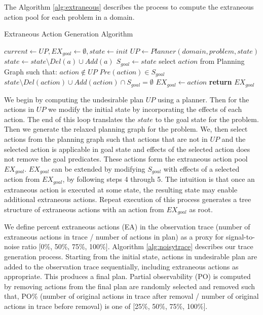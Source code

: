 The Algorithm \ref{alg:extraneous} describes the process to compute the extraneous action pool for each problem in a domain.
\begin{algorithm}
    \caption{Extraneous Action Generation Algorithm}
    \label{alg:extraneous}
    \begin{algorithmic}[1]
        	\State $current\gets UP, EX_{goal}\gets \emptyset, state \gets init$
        	\State $UP\gets Planner(domain,problem,state)$
        		\State $state\gets state\setminus Del(a)\cup Add(a)$
        		\EndIf
        	\EndFor
        	\State $S_{goal}\gets state$
        	\State select $action$ from Planning Graph such that:
        	\State \hspace*{10pt}$action \notin UP$
        	\State \hspace*{10pt}$Pre(action) \in S_{goal}$
        	\State \hspace*{10pt}$state \setminus Del(action) \cup Add(action) \cap S_{goal} = \emptyset$
        	\State $EX_{goal} \gets action$
            \State \textbf{return} $EX_{goal}$
        \EndProcedure
    \end{algorithmic}
\end{algorithm}
We begin by computing the undesirable plan $UP$ using a planner. Then for the actions in $UP$ we modify the initial state by incorporating the effects of each action. The end of this loop translates the $state$ to the goal state for the problem. Then we generate the relaxed planning graph for the problem. We, then select actions from the planning graph such that actions that are not in $UP$ and the selected action is applicable in goal state and effects of the selected action does not remove the goal predicates. These actions form the extraneous action pool $EX_{goal}$. $EX_{goal}$ can be extended by modifying $S_{goal}$ with effects of a selected action from $EX_{goal}$, by following steps 4 through 5. The intuition is that once an extraneous action is executed at some state, the resulting state may enable additional extraneous actions. Repeat execution of this process generates a tree structure of extraneous actions with an action from $EX_{goal}$ as root. 


We define percent extraneous actions (EA) in the observation trace (number of extraneous actions in trace / number of actions in plan) as a proxy for signal-to-noise ratio $[$0\%, 50\%, 75\%, 100\%$]$. Algorithm \ref{alg:noisytrace} describes our trace generation process. Starting from the initial state, actions in undesirable plan are added to the observation trace sequentially, including extraneous actions as appropriate. 
This produces a final plan. Partial observability (PO) is computed by removing actions from the final plan are randomly selected and removed such that, PO\% (number of original actions in trace after removal / number of original actions in trace before removal) is one of $[$25\%, 50\%, 75\%, 100\%$]$. 


